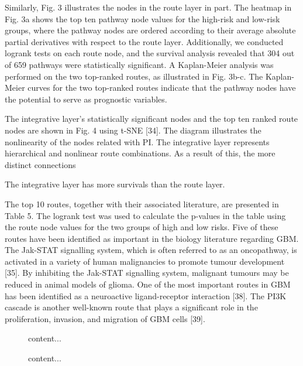 \documentclass[10pt,twocolumn,twoside,lineno]{gsajnl}
\begin{document}
Similarly, Fig. 3 illustrates the nodes in the route layer in part. The heatmap in Fig. 3a shows the top ten pathway node values for the high-risk and low-risk groups, where the pathway nodes are ordered according to their average absolute partial derivatives with respect to the route layer. Additionally, we conducted logrank tests on each route node, and the survival analysis revealed that 304 out of 659 pathways were statistically significant. A Kaplan-Meier analysis was performed on the two top-ranked routes, as illustrated in Fig. 3b-c. The Kaplan-Meier curves for the two top-ranked routes indicate that the pathway nodes have the potential to serve as prognostic variables.



The integrative layer's statistically significant nodes and the top ten ranked route nodes are shown in Fig. 4 using t-SNE [34]. The diagram illustrates the nonlinearity of the nodes related with PI. The integrative layer represents hierarchical and nonlinear route combinations. As a result of this, the more distinct connections

The integrative layer has more survivals than the route layer.

The top 10 routes, together with their associated literature, are presented in Table 5. The logrank test was used to calculate the p-values in the table using the route node values for the two groups of high and low risks. Five of these routes have been identified as important in the biology literature regarding GBM. The Jak-STAT signalling system, which is often referred to as an oncopathway, is activated in a variety of human malignancies to promote tumour development [35]. By inhibiting the Jak-STAT signalling system, malignant tumours may be reduced in animal models of glioma. One of the most important routes in GBM has been identified as a neuroactive ligand-receptor interaction [38]. The PI3K cascade is another well-known route that plays a significant role in the proliferation, invasion, and migration of GBM cells [39].

\begin{figure}
	content...
\end{figure}


\begin{figure}
	content...
\end{figure}
\end{document}
